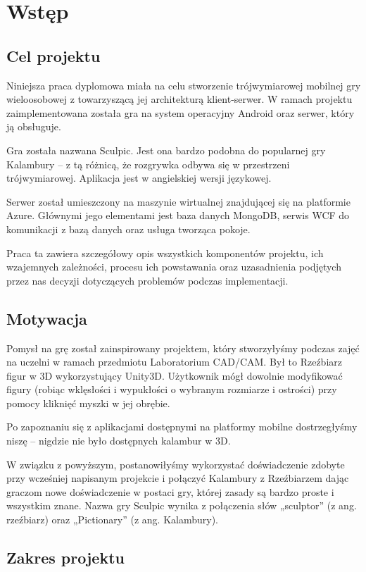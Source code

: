 \chapter{Wstęp}

\section{Cel projektu}
Niniejsza praca dyplomowa miała na celu stworzenie trójwymiarowej mobilnej gry wieloosobowej z towarzyszącą jej architekturą klient-serwer. W ramach projektu zaimplementowana została gra na system operacyjny Android oraz serwer, który ją obsługuje.

Gra została nazwana Sculpic. Jest ona bardzo podobna do popularnej gry Kalambury – z tą różnicą, że rozgrywka odbywa się w przestrzeni trójwymiarowej. Aplikacja jest w angielskiej wersji językowej.

Serwer został umieszczony na maszynie wirtualnej znajdującej się na platformie Azure. Głównymi jego elementami jest baza danych MongoDB, serwis WCF do komunikacji z bazą danych oraz usługa tworząca pokoje.

Praca ta zawiera szczegółowy opis wszystkich komponentów projektu, ich wzajemnych zależności, procesu ich powstawania oraz uzasadnienia podjętych przez nas decyzji dotyczących problemów podczas implementacji.

\section{Motywacja}
Pomysł na grę został zainspirowany projektem, który stworzyłyśmy podczas zajęć na uczelni w ramach przedmiotu Laboratorium CAD/CAM. Był to Rzeźbiarz figur w 3D wykorzystujący Unity3D. Użytkownik mógł dowolnie modyfikować figury (robiąc wklęsłości i wypukłości o wybranym rozmiarze i ostrości) przy pomocy kliknięć myszki w jej obrębie.

Po zapoznaniu się z aplikacjami dostępnymi na platformy mobilne dostrzegłyśmy niszę – nigdzie nie było dostępnych kalambur w 3D.

W związku z powyższym, postanowiłyśmy wykorzystać doświadczenie zdobyte przy wcześniej napisanym projekcie i połączyć Kalambury z Rzeźbiarzem dając graczom nowe doświadczenie w postaci gry, której zasady są bardzo proste i wszystkim znane. Nazwa gry Sculpic wynika z połączenia słów „sculptor” (z ang. rzeźbiarz) oraz „Pictionary” (z ang. Kalambury).

\section{Zakres projektu}
